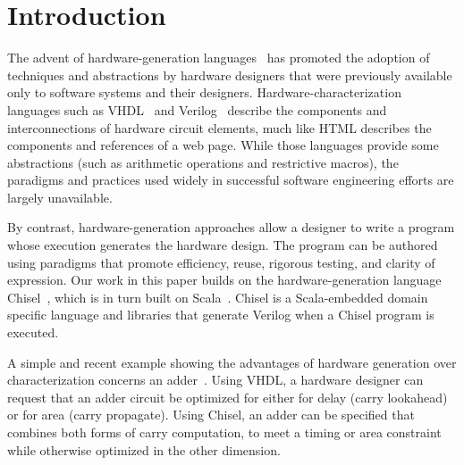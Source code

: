 \documentclass[sigplan,anonymous,review]{acmart}
\begin{document}

\maketitle

\section{Introduction}

The advent of hardware-generation languages~\cite{chisel:article} has promoted the adoption of techniques and abstractions by hardware designers that were previously available only to software systems and their designers. Hardware-characterization languages such as VHDL~\cite{vhdl} and Verilog~\cite{verilog} describe the components and interconnections of hardware circuit elements, much like HTML describes the components and references of a web page. While those languages provide some abstractions (such as arithmetic operations and restrictive macros), the paradigms and practices used widely in successful software engineering efforts are largely unavailable.

By contrast, hardware-generation approaches allow a designer to write a program whose execution generates the hardware design. The program can be authored using para\-digms that promote efficiency, reuse, rigorous testing, and clarity of expression. Our work in this paper builds on the hardware-generation language Chisel~\cite{chisel:book}, which is in turn built on Scala~\cite{scala-overview-tech-report}. Chisel is a Scala-embedded domain specific language and libraries that generate Verilog when a Chisel program is executed.

A simple and recent example showing the advantages of hardware generation over characterization concerns an adder~\cite{Deters:adder}. Using VHDL, a hardware designer can request that an adder circuit be optimized for either for delay (carry lookahead) or for area (carry propagate). Using Chisel, an adder can be specified that combines both forms of carry computation, to meet a timing or area constraint while otherwise optimized in the other dimension.
\end{document}

